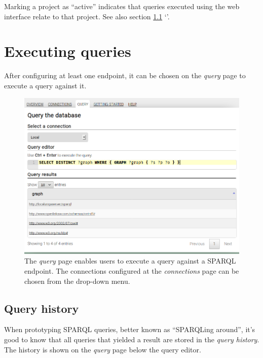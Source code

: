   Marking a project as ``active'' indicates that queries executed using the web
  interface relate to that project.  See also section \ref{sec:query-history}
  {\color{LinkGray}`'}.

\section{Executing queries}

  After configuring at least one endpoint, it can be chosen on the \emph{query}
  page to execute a query against it.

  \begin{figure}[h]
    \begin{center}
      \includegraphics[width=1.0\textwidth]{figures/web-query.png}
    \end{center}
    \caption{The \emph{query} page enables users to execute a query against a
      SPARQL endpoint.  The connections configured at the \emph{connections} page
      can be chosen from the drop-down menu.}
    \label{fig:web-query}
  \end{figure}

\subsection{Query history}
\label{sec:query-history}

  When prototyping SPARQL queries, better known as ``SPARQLing around'', it's
  good to know that all queries that yielded a result are stored in the
  \emph{query history}.  The history is shown on the \emph{query} page below the
  query editor.

